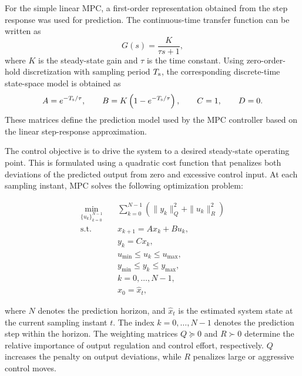For the simple linear MPC, a first-order representation obtained from the step response was used for prediction. The continuous-time transfer function can be written as
\begin{equation}
G(s) = \frac{K}{\tau s + 1},
\label{eq:first_order_transfer}
\end{equation}
where $K$ is the steady-state gain and $\tau$ is the time constant. Using zero-order-hold discretization with sampling period $T _{\text{s}}$, the corresponding discrete-time state-space model is obtained as
\begin{equation}
A = e^{-T _{\text{s}}/\tau}, \qquad
B = K\left(1 - e^{-T _{\text{s}}/\tau}\right), \qquad
C = 1, \qquad
D = 0.
\label{eq:first_order_discrete_matrices}
\end{equation}
These matrices define the prediction model used by the MPC controller based on the linear step-response approximation.

The control objective is to drive the system to a desired steady-state operating point. This is formulated using a quadratic cost function that penalizes both deviations of the predicted output from zero and excessive control input. At each sampling instant, MPC solves the following optimization problem:


    
    \begin{equation}
        \begin{aligned}
        \min_{\{u_k\}_{k=0}^{N-1}} \quad &
        \sum_{k=0}^{N-1}
        \left(
        \|y_k\|_Q^2 + \|u_k\|_R^2
        \right) \\
        \text{s.t.} \quad
        & x_{k+1} = A x_k + B u_k, \\
        & y_k = C x_k, \\
        & u_{\min} \le u_k \le u_{\max}, \\
        & y_{\min} \le y_k \le y_{\max}, \\
        & k = 0,\ldots,N-1, \\
        & x_{0} = \hat{x}_{t},
        \end{aligned}
        \label{eq:mpc_optimization}
    \end{equation}
    

    where $N$ denotes the prediction horizon, and $\hat{x}_{t}$ is the estimated system state at the current sampling instant $t$. The index $k = 0,\ldots,N-1$ denotes the prediction step within the horizon. The weighting matrices $Q \succeq 0$ and $R \succ 0$ determine the relative importance of output regulation and control effort, respectively. $Q$ increases the penalty on output deviations, while $R$ penalizes large or aggressive control moves.


